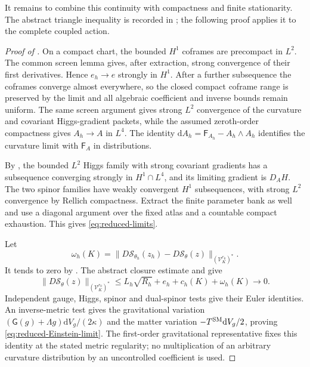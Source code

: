 \documentclass[11pt]{article}
\numberwithin{equation}{section}
\theoremstyle{definition}
\theoremstyle{remark}
\newcommand{\dd}{\mathrm d}
\newcommand{\norm}[1]{\lVert#1\rVert}
\newcommand{\Sact}{\mathscr S}
\newcommand{\Vtest}{\mathscr V}
\newcommand{\Fcurv}{\mathsf F}
\newcommand{\Eins}{\mathsf G}
\newcommand{\dV}{\dd V}
\begin{document}
It remains to combine this continuity with compactness and finite
stationarity. The abstract triangle inequality is recorded in
; the following proof applies it to the complete
coupled action.

\begin{proof}[Proof of ]
On a compact chart, the bounded $H^1$ coframes are precompact in $L^2$.
The common screen lemma gives, after extraction, strong convergence of their
first derivatives.  Hence $e_h\to e$ strongly in $H^1$.  After a further
subsequence the coframes converge almost everywhere, so the closed compact
coframe range is preserved by the limit and all algebraic coefficient and
inverse bounds remain uniform.  The same screen argument gives strong
$L^2$ convergence of the curvature and covariant Higgs-gradient packets,
while the assumed zeroth-order compactness gives $A_h\to A$ in $L^4$.
The identity
$\dd A_h=\Fcurv_{A_h}-A_h\wedge A_h$ identifies the curvature limit with
$\Fcurv_A$ in distributions.

By , the bounded $L^2$ Higgs family with
strong covariant gradients has a subsequence converging strongly in
$H^1\cap L^4$, and its limiting gradient is $D_AH$.  The two spinor families
have weakly convergent $H^1$ subsequences, with strong $L^2$ convergence by
Rellich compactness.  Extract the finite parameter bank as well and use a
diagonal argument over the fixed atlas and a countable compact exhaustion.
This gives \eqref{eq:reduced-limits}.

Let
\[
 \omega_h(K)=\norm{D\Sact_{\theta_h}(z_h)-D\Sact_\theta(z)}_
 {(\Vtest_K^{r_0})^*}.
\]
It tends to zero by .  The abstract closure
estimate and  give
\begin{equation}
 \norm{D\Sact_\theta(z)}_{(\Vtest_K^{r_0})^*}
 \le L_h\sqrt{R_h}+e_h+c_h(K)+\omega_h(K)\longrightarrow0.
 \label{eq:reduced-residual-bound}
\end{equation}
Independent gauge, Higgs, spinor and dual-spinor tests give their Euler
identities.  An inverse-metric test gives the gravitational variation
$(\Eins(g)+\Lambda g)\dV_g/(2\kappa)$ and the matter variation
$-T^{\rm SM}\dV_g/2$, proving \eqref{eq:reduced-Einstein-limit}.  The
first-order gravitational representative fixes this identity at the stated
metric regularity; no multiplication of an arbitrary curvature distribution
by an uncontrolled coefficient is used.
\end{proof}
\end{document}
